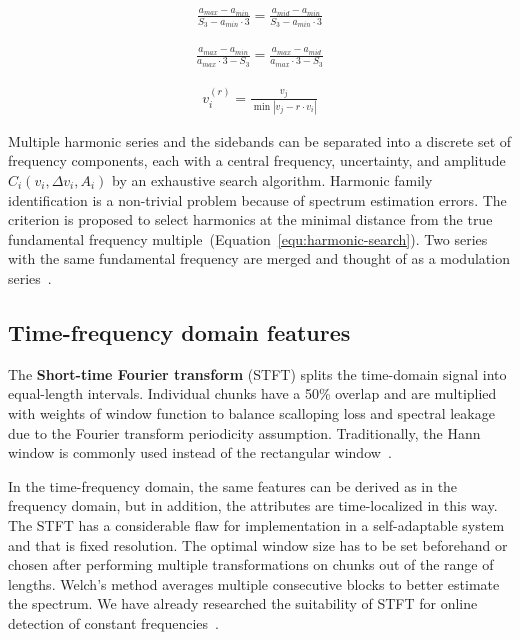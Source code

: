\begin{ceqn}\begin{align}
\frac{a_{max} - a_{min}}{S_3 - a_{min} \cdot 3} = \frac{a_{mid} - a_{min}}{S_3 - a_{min} \cdot 3}
\label{equ:mms-maxima}
\end{align}\end{ceqn}

\begin{ceqn}\begin{align}
\frac{a_{max} - a_{min}}{a_{max} \cdot 3 - S_3} = \frac{a_{max} - a_{mid}}{a_{max} \cdot 3 - S_3}
\label{equ:mms-minima}
 \end{align}\end{ceqn}
 
\begin{ceqn}\begin{align}
v_i^{(r)} = \frac{v_j}{\min{|v_j - r \cdot v_i|}}
\label{equ:harmonic-search}
\end{align}\end{ceqn}

Multiple harmonic series and the sidebands can be separated into a discrete set of frequency components, each with a central frequency, uncertainty, and amplitude $C_i(v_i, \Delta v_i, A_i)$ by an exhaustive search algorithm. Harmonic family identification is a non-trivial problem because of spectrum estimation errors. The criterion is proposed to select harmonics at the minimal distance from the true fundamental frequency multiple~(Equation~\ref{equ:harmonic-search}). Two series with the same fundamental frequency are merged and thought of as a modulation series~\cite{gerber_identification_2013}.

\subsection{Time-frequency domain features}
The \textbf{Short-time Fourier transform} (STFT) splits the time-domain signal into equal-length intervals. Individual chunks have a 50\% overlap and are multiplied with weights of window function to balance scalloping loss and spectral leakage due to the Fourier transform periodicity assumption. Traditionally, the Hann window is commonly used instead of the rectangular window~\cite{ziaran_technicka_2013,noauthor_iso_2016_2}.

In the time-frequency domain, the same features can be derived as in the frequency domain, but in addition, the attributes are time-localized in this way. The STFT has a considerable flaw for implementation in a self-adaptable system and that is fixed resolution. The optimal window size has to be set beforehand or chosen after performing multiple transformations on chunks out of the range of lengths. Welch's method averages multiple consecutive blocks to better estimate the spectrum. We have already researched the suitability of STFT for online detection of constant frequencies~\cite{hajek_iot_2022}.

